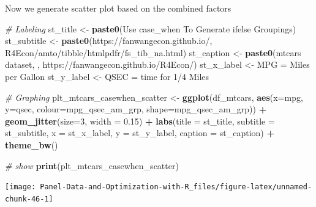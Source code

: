 \documentclass[
]{book}
\newenvironment{Shaded}{\begin{snugshade}}{\end{snugshade}}
\newcommand{\CommentTok}[1]{\textcolor[rgb]{0.56,0.35,0.01}{\textit{#1}}}
\newcommand{\DataTypeTok}[1]{\textcolor[rgb]{0.13,0.29,0.53}{#1}}
\newcommand{\DecValTok}[1]{\textcolor[rgb]{0.00,0.00,0.81}{#1}}
\newcommand{\FloatTok}[1]{\textcolor[rgb]{0.00,0.00,0.81}{#1}}
\newcommand{\KeywordTok}[1]{\textcolor[rgb]{0.13,0.29,0.53}{\textbf{#1}}}
\newcommand{\NormalTok}[1]{#1}
\newcommand{\OperatorTok}[1]{\textcolor[rgb]{0.81,0.36,0.00}{\textbf{#1}}}
\newcommand{\StringTok}[1]{\textcolor[rgb]{0.31,0.60,0.02}{#1}}
\begin{document}
Now we generate scatter plot based on the combined factors

\begin{Shaded}
\begin{Highlighting}[]
\CommentTok{\# Labeling}
\NormalTok{st\_title \textless{}{-}}\StringTok{ }\KeywordTok{paste0}\NormalTok{(}\StringTok{\textquotesingle{}Use case\_when To Generate ifelse Groupings\textquotesingle{}}\NormalTok{)}
\NormalTok{st\_subtitle \textless{}{-}}\StringTok{ }\KeywordTok{paste0}\NormalTok{(}\StringTok{\textquotesingle{}https://fanwangecon.github.io/\textquotesingle{}}\NormalTok{,}
                      \StringTok{\textquotesingle{}R4Econ/amto/tibble/htmlpdfr/fs\_tib\_na.html\textquotesingle{}}\NormalTok{)}
\NormalTok{st\_caption \textless{}{-}}\StringTok{ }\KeywordTok{paste0}\NormalTok{(}\StringTok{\textquotesingle{}mtcars dataset, \textquotesingle{}}\NormalTok{,}
                     \StringTok{\textquotesingle{}https://fanwangecon.github.io/R4Econ/\textquotesingle{}}\NormalTok{)}
\NormalTok{st\_x\_label \textless{}{-}}\StringTok{ \textquotesingle{}MPG = Miles per Gallon\textquotesingle{}}
\NormalTok{st\_y\_label \textless{}{-}}\StringTok{ \textquotesingle{}QSEC = time for 1/4 Miles\textquotesingle{}}

\CommentTok{\# Graphing}
\NormalTok{plt\_mtcars\_casewhen\_scatter \textless{}{-}}\StringTok{ }
\StringTok{  }\KeywordTok{ggplot}\NormalTok{(df\_mtcars, }
         \KeywordTok{aes}\NormalTok{(}\DataTypeTok{x=}\NormalTok{mpg, }\DataTypeTok{y=}\NormalTok{qsec, }
             \DataTypeTok{colour=}\NormalTok{mpg\_qsec\_am\_grp, }
             \DataTypeTok{shape=}\NormalTok{mpg\_qsec\_am\_grp)) }\OperatorTok{+}
\StringTok{  }\KeywordTok{geom\_jitter}\NormalTok{(}\DataTypeTok{size=}\DecValTok{3}\NormalTok{, }\DataTypeTok{width =} \FloatTok{0.15}\NormalTok{) }\OperatorTok{+}
\StringTok{  }\KeywordTok{labs}\NormalTok{(}\DataTypeTok{title =}\NormalTok{ st\_title, }\DataTypeTok{subtitle =}\NormalTok{ st\_subtitle,}
       \DataTypeTok{x =}\NormalTok{ st\_x\_label, }\DataTypeTok{y =}\NormalTok{ st\_y\_label, }\DataTypeTok{caption =}\NormalTok{ st\_caption) }\OperatorTok{+}
\StringTok{  }\KeywordTok{theme\_bw}\NormalTok{()}

\CommentTok{\# show}
\KeywordTok{print}\NormalTok{(plt\_mtcars\_casewhen\_scatter)}
\end{Highlighting}
\end{Shaded}

\begin{center}\texttt{[image: Panel-Data-and-Optimization-with-R\_files/figure-latex/unnamed-chunk-46-1]} \end{center}
\end{document}

